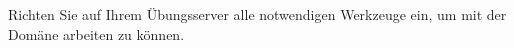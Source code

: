 \item Richten Sie auf Ihrem Übungsserver alle notwendigen Werkzeuge ein,
um mit der Domäne  arbeiten zu können.
